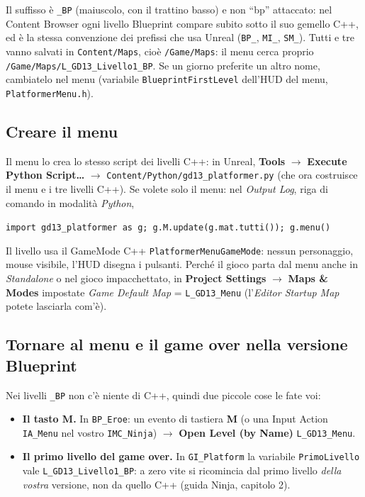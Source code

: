 \documentclass[a4paper,10pt]{article}
\newcommand{\nodo}[1]{\textsf{\textbf{#1}}}
\newcommand{\var}[1]{\texttt{#1}}
\begin{document}
Il suffisso è \var{\_BP} (maiuscolo, con il trattino basso) e non ``bp'' attaccato: nel Content Browser ogni livello Blueprint compare subito sotto il suo gemello C++, ed è la stessa convenzione dei prefissi che usa Unreal (\var{BP\_}, \var{MI\_}, \var{SM\_}). Tutti e tre vanno salvati in \texttt{Content/Maps}, cioè \texttt{/Game/Maps}: il menu cerca proprio \texttt{/Game/Maps/L\_GD13\_Livello1\_BP}. Se un giorno preferite un altro nome, cambiatelo nel menu (variabile \var{BlueprintFirstLevel} dell'HUD del menu, \texttt{PlatformerMenu.h}).

\subsection{Creare il menu}

Il menu lo crea lo stesso script dei livelli C++: in Unreal, \nodo{Tools} $\rightarrow$ \nodo{Execute Python Script\dots} $\rightarrow$ \texttt{Content/Python/gd13\_platformer.py} (che ora costruisce il menu e i tre livelli C++). Se volete solo il menu: nel \emph{Output Log}, riga di comando in modalità \emph{Python},
\begin{center}\texttt{import gd13\_platformer as g; g.M.update(g.mat.tutti()); g.menu()}\end{center}
Il livello usa il GameMode C++ \var{PlatformerMenuGameMode}: nessun personaggio, mouse visibile, l'HUD disegna i pulsanti. Perché il gioco parta dal menu anche in \emph{Standalone} o nel gioco impacchettato, in \nodo{Project Settings} $\rightarrow$ \nodo{Maps \& Modes} impostate \emph{Game Default Map} = \var{L\_GD13\_Menu} (l'\emph{Editor Startup Map} potete lasciarla com'è).

\subsection{Tornare al menu e il game over nella versione Blueprint}

Nei livelli \var{\_BP} non c'è niente di C++, quindi due piccole cose le fate voi:

\begin{itemize}
  \item \textbf{Il tasto M.} In \var{BP\_Eroe}: un evento di tastiera \nodo{M} (o una Input Action \var{IA\_Menu} nel vostro \var{IMC\_Ninja}) $\rightarrow$ \nodo{Open Level (by Name)} \var{L\_GD13\_Menu}.
  \item \textbf{Il primo livello del game over.} In \var{GI\_Platform} la variabile \var{PrimoLivello} vale \var{L\_GD13\_Livello1\_BP}: a zero vite si ricomincia dal primo livello \emph{della vostra} versione, non da quello C++ (guida Ninja, capitolo 2).
\end{itemize}
\end{document}
